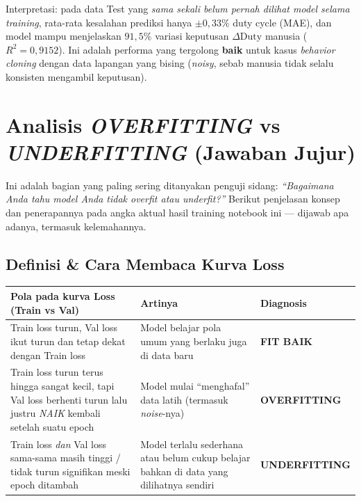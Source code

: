 \documentclass[11pt,a4paper]{article}
\begin{document}
Interpretasi: pada data Test yang \emph{sama sekali belum pernah dilihat model selama
training}, rata-rata kesalahan prediksi hanya $\pm0{,}33\%$ duty cycle (MAE), dan model
mampu menjelaskan $91{,}5\%$ variasi keputusan $\Delta\mathrm{Duty}$ manusia
($R^2=0{,}9152$). Ini adalah performa yang tergolong \textbf{baik} untuk kasus
\emph{behavior cloning} dengan data lapangan yang bising (\emph{noisy}, sebab manusia
tidak selalu konsisten mengambil keputusan).

\section{Analisis \emph{OVERFITTING} vs \emph{UNDERFITTING} (Jawaban Jujur)}
\label{sec:overfit}

Ini adalah bagian yang paling sering ditanyakan penguji sidang: \emph{``Bagaimana Anda
tahu model Anda tidak overfit atau underfit?''} Berikut penjelasan konsep dan
penerapannya pada angka aktual hasil training notebook ini --- dijawab apa adanya,
termasuk kelemahannya.

\subsection{Definisi \& Cara Membaca Kurva Loss}

\begin{center}
\begin{tabular}{@{}p{5.2cm} p{5.0cm} p{2.9cm}@{}}
\toprule
\textbf{Pola pada kurva Loss (Train vs Val)} & \textbf{Artinya} & \textbf{Diagnosis} \\
\midrule
Train loss turun, Val loss ikut turun dan tetap dekat dengan Train loss &
Model belajar pola umum yang berlaku juga di data baru & \textbf{FIT BAIK} \\
\addlinespace
Train loss turun terus hingga sangat kecil, tapi Val loss berhenti turun lalu justru
\emph{NAIK} kembali setelah suatu epoch &
Model mulai ``menghafal'' data latih (termasuk \emph{noise}-nya) & \textbf{OVERFITTING} \\
\addlinespace
Train loss \emph{dan} Val loss sama-sama masih tinggi / tidak turun signifikan meski
epoch ditambah &
Model terlalu sederhana atau belum cukup belajar bahkan di data yang dilihatnya sendiri &
\textbf{UNDERFITTING} \\
\bottomrule
\end{tabular}
\end{center}
\end{document}
